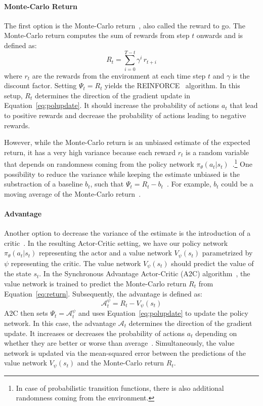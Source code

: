 \paragraph{Monte-Carlo Return}

The first option is the Monte-Carlo return~\cite{Schulman2016GAE, Peng2018Mimic}, also called the reward to go. The Monte-Carlo return computes the sum of rewards from 
step $t$ onwards and is defined as: 
\begin{equation}
	R_t = \sum_{i=0}^{T-t} \gamma^{i} \, r_{t+i}
	\label{eq:return}
\end{equation}
where $r_t$ are the rewards from the environment at each time step $t$ and $\gamma$ is the discount factor.
Setting $\Psi_t = R_t$ yields the REINFORCE~\cite{Williams1992REINFORCE} algorithm.
In this setup, $R_t$ determines the direction of the gradient update in Equation~\ref{eq:polupdate}. It should increase the probability 
of actions $a_t$ that lead to positive rewards and decrease the probability of actions leading to negative rewards.

However, while the Monte-Carlo return is an unbiased estimate of the expected return, it has a very high variance because each reward $r_t$ is a random variable that depends on randomness 
coming from the policy network $\pi_{\theta}(a_t | s_t)$~\cite{Peng2018Mimic}.\footnote{In case of probabilistic transition functions, there is also additional randomness coming from the environment.}
One possibility to reduce the variance while keeping the estimate unbiased is the substraction of a baseline $b_t$, such that $\Psi_t = R_t - b_t$~\cite{Mnih2016A2C}.
For example, $b_t$ could be a moving average of the Monte-Carlo return~\cite{Das2018Minerva}.


\paragraph{Advantage}
Another option to decrease the variance of the estimate is the introduction of a critic~\cite{Sutton1998RL}. In the resulting 
Actor-Critic setting, we have our policy network $\pi_\theta(a_t | s_t)$ representing the actor and a value network $V_\psi(s_t)$ parametrized by $\psi$ representing the critic.
The value network $V_\psi(s_t)$ should predict the value of the state $s_t$. In the 
Synchronous Advantage Actor-Critic (A2C) algorithm~\cite{Mnih2016A2C}, the value network is trained to predict the 
Monte-Carlo return $R_t$ from Equation~\ref{eq:return}. Subsequently, the advantage is defined as:
\begin{equation}
	\mathcal{A}_t^\psi = R_t - V_\psi(s_t)
	\label{eq:advantage}
\end{equation}
A2C then sets $\Psi_t = \mathcal{A}_t^\psi$ and uses Equation~\ref{eq:polupdate} to update the policy network.
In this case, the advantage $\mathcal{A}_t$ determines the direction of the gradient update. It increases or decreases the 
probability of actions $a_t$ depending on whether they are better or worse than average~\cite{Schulman2016GAE}.
Simultaneously, the value network is updated via the mean-squared error between the predictions 
of the value network $V_\psi(s_t)$ and the Monte-Carlo return $R_t$.

